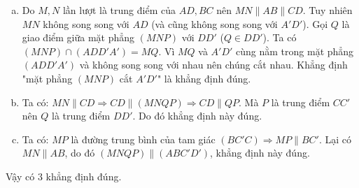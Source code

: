 \begin{ex}
{\begin{center}
		\end{center}
		\begin{enumerate}[a)]
			\item Do $M, N$ lần lượt là trung điểm của $AD, BC$ nên $MN \parallel AB \parallel CD$. Tuy nhiên $MN$ không song song với $AD$ (và cũng không song song với $A'D'$). Gọi $Q$ là giao điểm giữa mặt phẳng $(MNP)$ với $DD'$ ($Q \in DD'$). Ta có $(MNP) \cap (ADD'A') = MQ$. Vì $MQ$ và $A'D'$ cùng nằm trong mặt phẳng $(ADD'A')$ và không song song với nhau nên chúng cắt nhau. Khẳng định "mặt phẳng $(MNP)$ cắt $A'D'$" là khẳng định đúng.
			\item Ta có: $MN \parallel CD \Rightarrow CD \parallel (MNQP) \Rightarrow CD \parallel QP$. Mà $P$ là trung điểm $CC'$ nên $Q$ là trung điểm $DD'$. Do đó khẳng định này đúng.
			\item Ta có: $MP$ là đường trung bình của tam giác $(BC'C) \Rightarrow MP \parallel BC'$.
			Lại có $MN \parallel AB$, do đó $(MNQP) \parallel (ABC'D')$, khẳng định này đúng.
		\end{enumerate}
		Vậy có $3$ khẳng định đúng.
	}
\end{ex}

